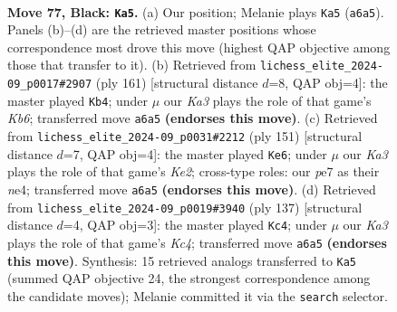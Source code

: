 \documentclass[11pt]{article}
\begin{document}
\clearpage

\begin{figure}[p]\centering
\begin{subfigure}{0.46\textwidth}\centering
\resizebox{\linewidth}{!}{%
\newchessgame
\chessboard[
  setfen={1Q4Q1/4P3/k7/7P/8/8/4K3/8 b - - 0 77},
  showmover=false,
  pgfstyle=straightmove, color=movearrow, markmove={a6-a5}
]}
\caption{}
\end{subfigure}\hfill
\begin{subfigure}{0.46\textwidth}\centering
\resizebox{\linewidth}{!}{%
\newchessgame
\chessboard[
  setfen={2Q4Q/8/8/6K1/8/1k6/8/8 b - - 2 81},
  showmover=false,
  pgfstyle=straightmove, color=movearrow, markmove={b3-b4}
]}
\caption{}
\end{subfigure}
\\[4pt]
\begin{subfigure}{0.46\textwidth}\centering
\resizebox{\linewidth}{!}{%
\newchessgame
\chessboard[
  setfen={1Q5Q/4k3/8/8/4N1K1/8/8/8 b - - 0 76},
  showmover=false,
  pgfstyle=straightmove, color=movearrow, markmove={e7-e6}
]}
\caption{}
\end{subfigure}\hfill
\begin{subfigure}{0.46\textwidth}\centering
\resizebox{\linewidth}{!}{%
\newchessgame
\chessboard[
  setfen={3Q3Q/8/8/2k5/p7/P5K1/8/8 b - - 0 69},
  showmover=false,
  pgfstyle=straightmove, color=movearrow, markmove={c5-c4}
]}
\caption{}
\end{subfigure}
\caption{\textbf{Move 77, Black: \texttt{Ka5}.} (a) Our position; Melanie plays \texttt{Ka5} (\texttt{a6a5}). Panels (b)--(d) are the retrieved master positions whose correspondence most drove this move (highest QAP objective among those that transfer to it). (b) Retrieved from \texttt{lichess\_elite\_2024-09\_p0017\#2907} (ply 161) [structural distance $d$=8, QAP obj=4]: the master played \texttt{Kb4}; under $\mu$ our \emph{Ka3} plays the role of that game's \emph{Kb6}; transferred move \texttt{a6a5} \textbf{(endorses this move)}. (c) Retrieved from \texttt{lichess\_elite\_2024-09\_p0031\#2212} (ply 151) [structural distance $d$=7, QAP obj=4]: the master played \texttt{Ke6}; under $\mu$ our \emph{Ka3} plays the role of that game's \emph{Ke2}; cross-type roles: our \emph{p}e7 as their \emph{n}e4; transferred move \texttt{a6a5} \textbf{(endorses this move)}. (d) Retrieved from \texttt{lichess\_elite\_2024-09\_p0019\#3940} (ply 137) [structural distance $d$=4, QAP obj=3]: the master played \texttt{Kc4}; under $\mu$ our \emph{Ka3} plays the role of that game's \emph{Kc4}; transferred move \texttt{a6a5} \textbf{(endorses this move)}. Synthesis: 15 retrieved analogs transferred to \texttt{Ka5} (summed QAP objective 24, the strongest correspondence among the candidate moves); Melanie committed it via the \texttt{search} selector.}
\label{fig:thought-m153}
\end{figure}
\end{document}
